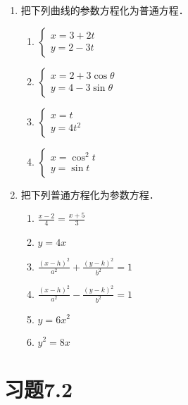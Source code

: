 \begin{ex}
\begin{enumerate}
    \item 把下列曲线的参数方程化为普通方程．
    \begin{multicols}{2}
\begin{enumerate}
    \item $\begin{cases}
        x=3+2t\\y=2-3t
    \end{cases}$
    \item $\begin{cases}
        x=2+3\cos\theta\\
        y=4-3\sin\theta
    \end{cases}$
    \item $\begin{cases}
        x=t\\y=4t^2
    \end{cases}$
    \item $\begin{cases}
        x=\cos^2 t\\ y=\sin t
    \end{cases}$
\end{enumerate}
    \end{multicols}

\item 把下列普通方程化为参数方程．
\begin{multicols}{2}
\begin{enumerate}
    \item $\frac{x-2}{4}=\frac{x+5}{3}$
    \item $y=4x$
    \item $\frac{(x-h)^2}{a^2}+\frac{(y-k)^2}{b^2}=1$
    \item $\frac{(x-h)^2}{a^2}-\frac{(y-k)^2}{b^2}=1$
    \item $y=6x^2$
    \item $y^2=8x$
\end{enumerate}
\end{multicols}
\end{enumerate}
\end{ex}

\section*{习题7.2}

